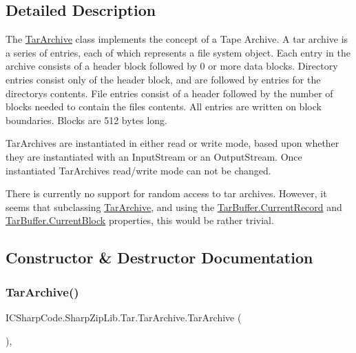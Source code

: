 \subsection{Detailed Description}
The \hyperlink{class_i_c_sharp_code_1_1_sharp_zip_lib_1_1_tar_1_1_tar_archive}{Tar\+Archive} class implements the concept of a \textquotesingle{}Tape Archive\textquotesingle{}. A tar archive is a series of entries, each of which represents a file system object. Each entry in the archive consists of a header block followed by 0 or more data blocks. Directory entries consist only of the header block, and are followed by entries for the directory\textquotesingle{}s contents. File entries consist of a header followed by the number of blocks needed to contain the file\textquotesingle{}s contents. All entries are written on block boundaries. Blocks are 512 bytes long. 

Tar\+Archives are instantiated in either read or write mode, based upon whether they are instantiated with an Input\+Stream or an Output\+Stream. Once instantiated Tar\+Archives read/write mode can not be changed.

There is currently no support for random access to tar archives. However, it seems that subclassing \hyperlink{class_i_c_sharp_code_1_1_sharp_zip_lib_1_1_tar_1_1_tar_archive}{Tar\+Archive}, and using the \hyperlink{class_i_c_sharp_code_1_1_sharp_zip_lib_1_1_tar_1_1_tar_buffer_a759d01e11ffdcdc372cdcdbde3852000}{Tar\+Buffer.\+Current\+Record} and \hyperlink{class_i_c_sharp_code_1_1_sharp_zip_lib_1_1_tar_1_1_tar_buffer_a369ffe3034447c016f1bc485feac3fd6}{Tar\+Buffer.\+Current\+Block} properties, this would be rather trivial. 

\subsection{Constructor \& Destructor Documentation}
\mbox{\label{class_i_c_sharp_code_1_1_sharp_zip_lib_1_1_tar_1_1_tar_archive_ace4eb3b6526d89877dbbef43ed06a597}} 
\subsubsection{\texorpdfstring{Tar\+Archive()}{TarArchive()}\hspace{0.1cm}{\footnotesize\ttfamily [1/3]}}
{\footnotesize\ttfamily I\+C\+Sharp\+Code.\+Sharp\+Zip\+Lib.\+Tar.\+Tar\+Archive.\+Tar\+Archive (\begin{DoxyParamCaption}{ }\end{DoxyParamCaption})\hspace{0.3cm}{\ttfamily [inline]}, {\ttfamily [protected]}}



